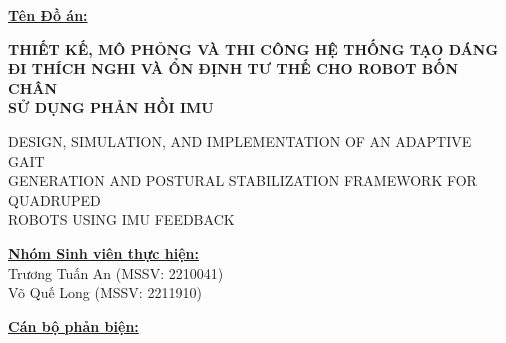 \documentclass[12pt,a4paper]{article}
\begin{document}
\vspace{0.2cm}

\noindent \underline{\textbf{Tên Đồ án:}}

\vspace{0.2cm}

\begin{center}
    {\large \textbf{THIẾT KẾ, MÔ PHỎNG VÀ THI CÔNG HỆ THỐNG TẠO DÁNG \\
    ĐI THÍCH NGHI VÀ ỔN ĐỊNH TƯ THẾ CHO ROBOT BỐN CHÂN \\
    SỬ DỤNG PHẢN HỒI IMU}}
    
    \vspace{0.1cm}
    {\small DESIGN, SIMULATION, AND IMPLEMENTATION OF AN ADAPTIVE GAIT \\
    GENERATION AND POSTURAL STABILIZATION FRAMEWORK FOR QUADRUPED \\
    ROBOTS USING IMU FEEDBACK}
\end{center}

\vspace{0.3cm}

\noindent
\begin{minipage}[t]{0.55\textwidth}
    \underline{\textbf{Nhóm Sinh viên thực hiện:}} \\[0.1cm]
    {\small Trương Tuấn An (MSSV: 2210041)}\\
    {\small Võ Quế Long (MSSV: 2211910)}
\end{minipage}
\hfill
\begin{minipage}[t]{0.4\textwidth}
    \underline{\textbf{Cán bộ phản biện:}} \\[0.1cm]
    \dotfill
\end{minipage}

\vspace{0.4cm}
\end{document}
